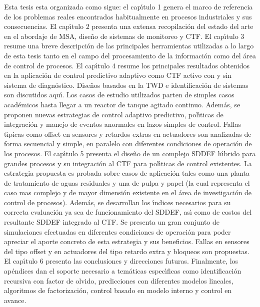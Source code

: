 Esta tesis esta organizada como sigue: el cap{\'\i}tulo 1 genera el marco de referencia de los problemas reales
encontrados habitualmente en procesos industriales y sus consecuencias. El cap{\'\i}tulo 2 presenta una extensa
recopilaci{\'o}n del estado del arte en el abordaje de MSA, dise{\~n}o de sistemas de monitoreo y CTF. El cap{\'\i}tulo
3 resume una breve descripci{\'o}n de las principales herramientas utilizadas a lo largo de esta tesis tanto en
el campo del procesamiento de la informaci{\'o}n como del {\'a}rea de control de procesos. El cap{\'\i}tulo 4 resume los
principales resultados obtenidos en la aplicaci{\'o}n de control predictivo adaptivo como CTF activo con y sin
sistema de diagn{\'o}stico. Dise{\~n}os basados en la TWD e identificaci{\'o}n de sistemas son discutidos aqu{\'\i}. Los
casos de estudio utilizados parten de simples casos acad{\'e}micos hasta llegar a un reactor de tanque agitado
continuo. Adem{\'a}s, se proponen nuevas estrategias de control adaptivo predictivo, pol{\'\i}ticas de integraci{\'o}n y
manejo de eventos anormales en lazos simples de control. Fallas t{\'\i}picas como offset en sensores y retardos
extras en actuadores son analizadas de forma secuencial y simple, en paralelo con diferentes condiciones de
operaci{\'o}n de los procesos. El cap{\'\i}tulo 5 presenta el dise{\~n}o de un complejo SDDEF h{\'\i}brido para grandes
procesos y su integraci{\'o}n al CTF para pol{\'\i}ticas de control existentes. La estrategia propuesta es probada
sobre casos de aplicaci{\'o}n tales como una planta de tratamiento de aguas residuales y una de pulpa y papel
(la cual representa el caso mas complejo y de mayor dimensi{\'o}n existente en el {\'a}rea de investigaci{\'o}n de
control de procesos). Adem{\'a}s, se desarrollan los {\'\i}ndices necesarios para su correcta evaluaci{\'o}n ya sea de
funcionamiento del SDDEF, as{\'\i} como de costos del resultante SDDEF integrado al CTF. Se presenta un gran
conjunto de simulaciones efectuadas en diferentes condiciones de operaci{\'o}n para poder apreciar el aporte
concreto de esta estrategia y sus beneficios. Fallas en sensores del tipo offset y  en actuadores del tipo
retardo extra y bloqueos son propuestas. El cap{\'\i}tulo 6 presenta las conclusiones y direcciones futuras.
Finalmente, los ap{\'e}ndices dan el soporte necesario a tem{\'a}ticas espec{\'\i}ficas como identificaci{\'o}n recursiva
con factor de olvido, predicciones con diferentes modelos lineales, algoritmos de factorizaci{\'o}n, control
basado en modelo interno y control en avance.

\clearpage

